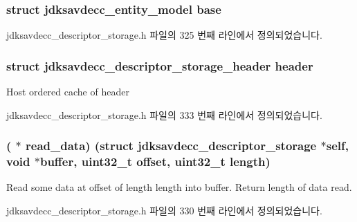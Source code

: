 \subsubsection[{\texorpdfstring{base}{base}}]{\setlength{\rightskip}{0pt plus 5cm}struct {\bf jdksavdecc\+\_\+entity\+\_\+model} base}\hypertarget{structjdksavdecc__descriptor__storage_ab9b4b2eaa5e1a290a371291da6a9a4d6}{}\label{structjdksavdecc__descriptor__storage_ab9b4b2eaa5e1a290a371291da6a9a4d6}


jdksavdecc\+\_\+descriptor\+\_\+storage.\+h 파일의 325 번째 라인에서 정의되었습니다.

\subsubsection[{\texorpdfstring{header}{header}}]{\setlength{\rightskip}{0pt plus 5cm}struct {\bf jdksavdecc\+\_\+descriptor\+\_\+storage\+\_\+header} header}\hypertarget{structjdksavdecc__descriptor__storage_ab5243bc10c0547b567bfe308e571200e}{}\label{structjdksavdecc__descriptor__storage_ab5243bc10c0547b567bfe308e571200e}
Host ordered cache of header 

jdksavdecc\+\_\+descriptor\+\_\+storage.\+h 파일의 333 번째 라인에서 정의되었습니다.

\subsubsection[{\texorpdfstring{read\+\_\+data}{read_data}}]{( $\ast$ read\+\_\+data) (struct {\bf jdksavdecc\+\_\+descriptor\+\_\+storage} $\ast$self, void $\ast${\bf buffer}, {\bf uint32\+\_\+t} offset, {\bf uint32\+\_\+t} length)}\hypertarget{structjdksavdecc__descriptor__storage_ab52d121ecc306cef68974022b2789962}{}\label{structjdksavdecc__descriptor__storage_ab52d121ecc306cef68974022b2789962}
Read some data at offset of length length into buffer. Return length of data read. 

jdksavdecc\+\_\+descriptor\+\_\+storage.\+h 파일의 330 번째 라인에서 정의되었습니다.

